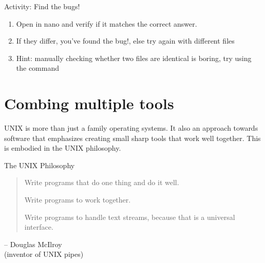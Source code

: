 \begin{frame}{Activity: Find the bugs!}

\begin{enumerate}
\item Open  in nano and verify if it matches the correct answer.
\item If they differ, you've found the bug!, else try again with different
 files
\item Hint: manually checking whether two files are identical is boring, try
using the  command
\end{enumerate}
\end{frame}


\section{Combing multiple tools} %
UNIX is more than just a family operating systems. It also an approach towards
software that emphasizes creating small sharp tools that work well together.
This is embodied in the UNIX philosophy.   

\begin{frame}{The UNIX Philosophy}
\begin{quote}
Write programs that do one thing and do it well.

Write programs to work together.

Write programs to handle text streams, because that is a universal interface.
\end{quote}
\begin{flushright}
-- Douglas McIlroy\\(inventor of UNIX pipes)
\end{flushright}
\end{frame}

